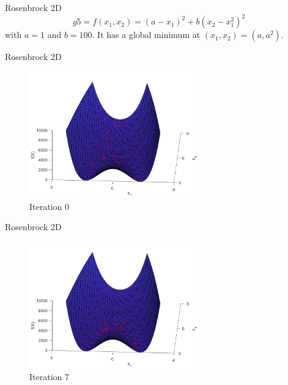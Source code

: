 \documentclass[xcolor=table]{beamer}
\begin{document}
\begin{frame}{Rosenbrock 2D}
  $$
    g5=f(x_1, x_2) = (a-x_1)^2+b(x_2-x_1^2)^2
  $$
  with $a = 1$ and $b=100$. It has a global minimum at $(x_1, x_2) = (a, a^2)$.
\end{frame}
\begin{frame}{Rosenbrock 2D}
  \begin{figure}[h]
  \begin{center}
    \includegraphics[width=0.65\textwidth]{img/smpl/rosn2d-1-100/loa-iter-0}
    \caption{Iteration 0}
  \end{center}
  \end{figure}
\end{frame}
\begin{frame}{Rosenbrock 2D}
  \begin{figure}[h]
  \begin{center}
    \includegraphics[width=0.65\textwidth]{img/smpl/rosn2d-1-100/loa-iter-7}
    \caption{Iteration 7}
  \end{center}
  \end{figure}
\end{frame}
\end{document}

